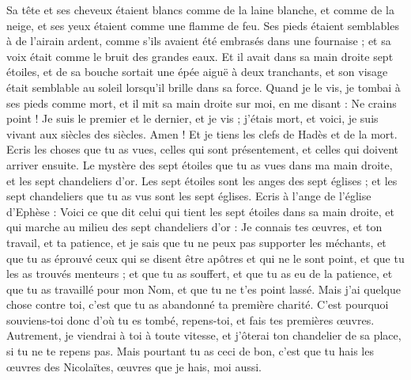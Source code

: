 \begin{multicols}{2}
Sa tête et ses cheveux étaient blancs comme de la laine blanche, et comme de la neige, et ses yeux étaient comme une flamme de feu.
Ses pieds étaient semblables à de l'airain ardent, comme s'ils avaient été embrasés dans une fournaise ; et sa voix était comme le bruit des grandes eaux.
Et il avait dans sa main droite sept étoiles, et de sa bouche sortait une épée aiguë à deux tranchants, et son visage était semblable au soleil lorsqu'il brille dans sa force.
Quand je le vis, je tombai à ses pieds comme mort, et il mit sa main droite sur moi, en me disant : Ne crains point !
Je suis le premier et le dernier, et je vis ; j'étais mort, et voici, je suis vivant aux siècles des siècles. Amen ! Et je tiens les clefs de Hadès et de la mort.
Ecris les choses que tu as vues, celles qui sont présentement, et celles qui doivent arriver ensuite.
Le mystère des sept étoiles que tu as vues dans ma main droite, et les sept chandeliers d'or. Les sept étoiles sont les anges des sept églises ; et les sept chandeliers que tu as vus sont les sept églises.
\VerseOne{}Ecris à l'ange de l'église d'Ephèse : Voici ce que dit celui qui tient les sept étoiles dans sa main droite, et qui marche au milieu des sept chandeliers d'or :
Je connais tes œuvres, et ton travail, et ta patience, et je sais que tu ne peux pas supporter les méchants, et que tu as éprouvé ceux qui se disent être apôtres et qui ne le sont point, et que tu les as trouvés menteurs ;
et que tu as souffert, et que tu as eu de la patience, et que tu as travaillé pour mon Nom, et que tu ne t'es point lassé.
Mais j'ai quelque chose contre toi, c'est que tu as abandonné ta première charité.
C'est pourquoi souviens-toi donc d'où tu es tombé, repens-toi, et fais tes premières œuvres. Autrement, je viendrai à toi à toute vitesse, et j'ôterai ton chandelier de sa place, si tu ne te repens pas.
Mais pourtant tu as ceci de bon, c'est que tu hais les œuvres des Nicolaïtes, œuvres que je hais, moi aussi.

\end{multicols}

